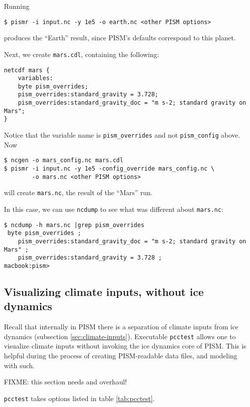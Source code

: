 Running
\begin{verbatim}
$ pismr -i input.nc -y 1e5 -o earth.nc <other PISM options>
\end{verbatim}
produces the ``Earth'' result, since PISM's defaults correspond to this planet.

Next, we create \verb|mars.cdl|, containing the following:
\small
\begin{verbatim}
netcdf mars {
    variables:
    byte pism_overrides;
    pism_overrides:standard_gravity = 3.728;
    pism_overrides:standard_gravity_doc = "m s-2; standard gravity on Mars";
}
\end{verbatim}
\normalsize
Notice that the variable name is \verb|pism_overrides| and not \verb|pism_config| above. Now
\begin{verbatim}
$ ncgen -o mars_config.nc mars.cdl
$ pismr -i input.nc -y 1e5 -config_override mars_config.nc \
        -o mars.nc <other PISM options>
\end{verbatim}
will create \verb|mars.nc|, the result of the ``Mars'' run.

In this case, we can use \verb|ncdump| to see what was different about \verb|mars.nc|:
\small
\begin{verbatim}
$ ncdump -h mars.nc |grep pism_overrides
 byte pism_overrides ;
    pism_overrides:standard_gravity_doc = "m s-2; standard gravity on Mars" ;
    pism_overrides:standard_gravity = 3.728 ;
macbook:pism>
\end{verbatim}
\normalsize


\subsection{Visualizing climate inputs, without ice dynamics}\label{subsect:pcctest}  Recall that
internally in PISM there is a separation of climate inputs from ice dynamics
(subsection \ref{sec:climate-inputs}).  Executable \verb|pcctest|
allows one to visualize climate inputs without invoking the ice dynamics core of PISM.
This is helpful during the process of creating PISM-readable data files, and modeling 
with such.

FIXME: this section needs and overhaul!

\verb|pcctest| takes options listed in table \ref{tab:pcctest}.

